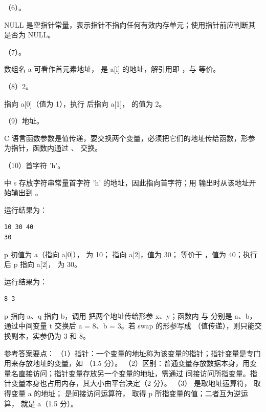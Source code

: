 \documentclass[a4paper,11pt]{article}
\begin{document}
\q （6）。\begin{analysis}NULL 是空指针常量，表示指针不指向任何有效内存单元；使用指针前应判断其是否为 NULL。\end{analysis}

\q （7）。\begin{analysis}数组名 a 可看作首元素地址， 是 a[i] 的地址，解引用即 ，与  等价。\end{analysis}

\q （8）2。\begin{analysis} 指向 a[0]（值为 1），执行  后指向 a[1]， 的值为 2。\end{analysis}

\q （9）地址。\begin{analysis}C 语言函数参数是值传递，要交换两个变量，必须把它们的地址传给函数，形参为指针，函数内通过 、 交换。\end{analysis}

\q （10）首字符 'h'。\begin{analysis} 中 s 存放字符串常量首字符 'h' 的地址，因此指向首字符；用  输出时从该地址开始输出到 。\end{analysis}


\q 运行结果为：
\begin{lstlisting}
10 30 40
30
\end{lstlisting}
\begin{analysis}p 初值为 a（指向 a[0]）， 为 10； 指向 a[2]，值为 30； 等价于 ，值为 40；执行  后 p 指向 a[2]， 为 30。\end{analysis}

\q 运行结果为：
\begin{lstlisting}
8 3
\end{lstlisting}
\begin{analysis}p 指向 a、q 指向 b，调用  把两个地址传给形参 x、y；函数内  与  分别是 a、b，通过中间变量 t 交换后 a = 8、b = 3。若 swap 的形参写成 （值传递），则只能交换副本，实参仍为 3 和 8。\end{analysis}


\q 参考答案要点：
（1）指针：一个变量的地址称为该变量的指针；指针变量是专门用来存放地址的变量，如 （1.5 分）。
（2）区别：普通变量存放数据本身，用变量名直接访问；指针变量存放另一个变量的地址，需通过  间接访问所指变量。指针变量本身也占用内存，其大小由平台决定（2 分）。
（3）\code{\&} 是取地址运算符， 取得变量 a 的地址；\code{*} 是间接访问运算符， 取得 p 所指变量的值；二者互为逆运算， 就是 a（1.5 分）。
\end{document}
